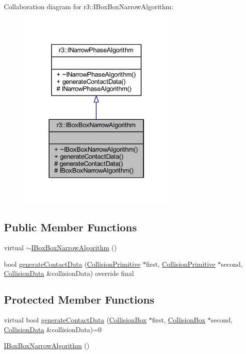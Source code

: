 Collaboration diagram for r3\+:\+:I\+Box\+Box\+Narrow\+Algorithm\+:\nopagebreak
\begin{figure}[H]
\begin{center}
\leavevmode
\includegraphics[width=226pt]{classr3_1_1_i_box_box_narrow_algorithm__coll__graph}
\end{center}
\end{figure}
\subsection*{Public Member Functions}
\begin{DoxyCompactItemize}
\item 
virtual \mbox{\hyperlink{classr3_1_1_i_box_box_narrow_algorithm_a384c60f79ed845100877e62d7e2a10f4}{$\sim$\+I\+Box\+Box\+Narrow\+Algorithm}} ()
\item 
bool \mbox{\hyperlink{classr3_1_1_i_box_box_narrow_algorithm_afd4e0f0abf3f2ff2f3b9d045529545ef}{generate\+Contact\+Data}} (\mbox{\hyperlink{classr3_1_1_collision_primitive}{Collision\+Primitive}} $\ast$first, \mbox{\hyperlink{classr3_1_1_collision_primitive}{Collision\+Primitive}} $\ast$second, \mbox{\hyperlink{classr3_1_1_collision_data}{Collision\+Data}} \&collision\+Data) override final
\end{DoxyCompactItemize}
\subsection*{Protected Member Functions}
\begin{DoxyCompactItemize}
\item 
virtual bool \mbox{\hyperlink{classr3_1_1_i_box_box_narrow_algorithm_a21de193b3a23825d9343780a1b771ec2}{generate\+Contact\+Data}} (\mbox{\hyperlink{classr3_1_1_collision_box}{Collision\+Box}} $\ast$first, \mbox{\hyperlink{classr3_1_1_collision_box}{Collision\+Box}} $\ast$second, \mbox{\hyperlink{classr3_1_1_collision_data}{Collision\+Data}} \&collision\+Data)=0
\item 
\mbox{\hyperlink{classr3_1_1_i_box_box_narrow_algorithm_a9e01be1ba6e1bbd925fca03f36f06752}{I\+Box\+Box\+Narrow\+Algorithm}} ()
\end{DoxyCompactItemize}


